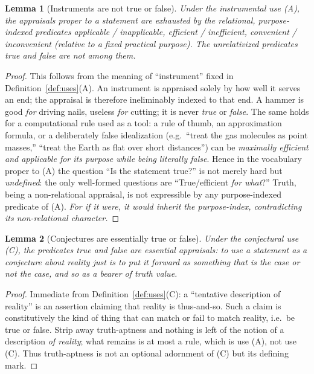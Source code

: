 \documentclass{amsart}
\theoremstyle{definition}
\theoremstyle{plain}
\newtheorem{lemma}{Lemma}
\begin{document}
\begin{lemma}[Instruments are not true or false]\label{lem:instr-notrue}
Under the instrumental use \textup{(A)}, the appraisals proper to a statement
are exhausted by the relational, purpose-indexed predicates \emph{applicable /
inapplicable}, \emph{efficient / inefficient}, \emph{convenient /
inconvenient} (relative to a fixed practical purpose). The unrelativized
predicates \emph{true} and \emph{false} are not among them.
\end{lemma}

\begin{proof}
This follows from the meaning of ``instrument'' fixed in
Definition~\ref{def:uses}(A). An instrument is appraised solely by how well it
serves an end; the appraisal is therefore ineliminably indexed to that end. A
hammer is good \emph{for} driving nails, useless \emph{for} cutting; it is
never \emph{true} or \emph{false}. The same holds for a computational rule used
as a tool: a rule of thumb, an approximation formula, or a deliberately false
idealization (e.g.\ ``treat the gas molecules as point masses,'' ``treat the
Earth as flat over short distances'') can be \emph{maximally efficient and
applicable for its purpose while being literally false}. Hence in the
vocabulary proper to (A) the question ``Is the statement true?'' is not merely
hard but \emph{undefined}: the only well-formed questions are ``True/efficient
\emph{for what}?'' Truth, being a non-relational appraisal, is not expressible
by any purpose-indexed predicate of (A). \emph{For if it were, it would inherit
the purpose-index, contradicting its non-relational character.}
\end{proof}

\begin{lemma}[Conjectures are essentially true or false]\label{lem:conj-true}
Under the conjectural use \textup{(C)}, the predicates \emph{true} and
\emph{false} are essential appraisals: to use a statement as a conjecture about
reality \emph{just is} to put it forward as something that is the case or not
the case, and so as a bearer of truth value.
\end{lemma}

\begin{proof}
Immediate from Definition~\ref{def:uses}(C): a ``tentative description of
reality'' is an assertion claiming that reality is thus-and-so. Such a claim is
constitutively the kind of thing that can match or fail to match reality, i.e.\
be true or false. Strip away truth-aptness and nothing is left of the notion of
a description \emph{of reality}; what remains is at most a rule, which is use
(A), not use (C). Thus truth-aptness is not an optional adornment of (C) but
its defining mark.
\end{proof}
\end{document}
